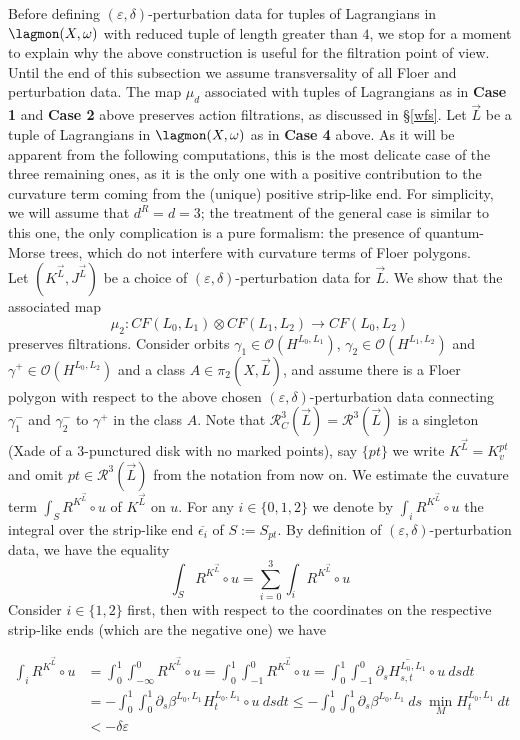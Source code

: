 	Before defining $(\varepsilon,\delta)$-perturbation data for tuples of Lagrangians in $\lagmon(X,\omega)$ with reduced tuple of length greater than $4$, we stop for a moment to explain why the above construction is useful for the filtration point of view. Until the end of this subsection we assume transversality of all Floer and perturbation data. The map $\mu_d$ associated with tuples of Lagrangians as in \textbf{Case 1} and \textbf{Case 2} above preserves action filtrations, as discussed in \S \ref{wfs}. Let $\vec{L}$ be a tuple of Lagrangians in $\lagmon(X,\omega)$ as in \textbf{Case 4} above. As it will be apparent from the following computations, this is the most delicate case of the three remaining ones, as it is the only one with a positive contribution to the curvature term coming from the (unique) positive strip-like end. For simplicity, we will assume that $d^R=d=3$; the treatment of the general case is similar to this one, the only complication is a pure formalism: the presence of quantum-Morse trees, which do not interfere with curvature terms of Floer polygons. \\ Let $(K^{\vec{L}}, J^{\vec{L}})$ be a choice of $(\varepsilon,\delta)$-perturbation data for $\vec{L}$. We show that the associated map $$\mu_2: CF(L_0,L_1)\otimes CF(L_1,L_2)\to CF(L_0,L_2)$$ preserves filtrations. Consider orbits $\gamma_1\in \mathcal{O}(H^{L_0,L_1})$, $\gamma_2\in \mathcal{O}(H^{L_1,L_2})$ and $\gamma^+\in \mathcal{O}(H^{L_0,L_2})$ and a class $A\in \pi_2(X,\vec{L})$, and assume there is a Floer polygon with respect to the above chosen $(\varepsilon,\delta)$-perturbation data connecting $\gamma_1^-$ and $\gamma_2^-$ to $\gamma^+$ in the class $A$. Note that $\mathcal{R}^{3}_C(\vec{L})=\mathcal{R}^{3}(\vec{L})$ is a singleton (Xade of a $3$-punctured disk with no marked points), say $\{pt\}$ we write $K^{\vec{L}}= K^{pt}_v$ and omit $pt\in \mathcal{R}^{3}(\vec{L})$ from the notation from now on. We estimate the cuvature term $\int_SR^{K^{\vec{L}}}\circ u$ of $K^{\vec{L}}$ on $u$. For any $i\in\{0,1,2\}$ we denote by $\int_iR^{K^{\vec{L}}}\circ u$ the integral over the strip-like end $\overline{\epsilon_i}$ of $S:=S_{pt}$. By definition of $(\varepsilon,\delta)$-perturbation data, we have the equality $$\int_S R^{K^{\vec{L}}}\circ u = \sum_{i=0}^3 \int_iR^{K^{\vec{L}}}\circ u$$ Consider $i\in \{1,2\}$ first, then with respect to the coordinates on the respective strip-like ends (which are the negative one) we have
	
	\begin{align*} \int_iR^{K^{\vec{L}}}\circ u &= \int_0^1\int_{-\infty}^0 R^{K^{\vec{L}}}\circ u = \int_0^1\int_{-1}^0 R^{K^{\vec{L}}}\circ u = \int_0^1\int_{-1}^0 \partial_s \overline{H^{L_0,L_1}_{s,t}}\circ u\ dsdt \\ & = -\int_0^1\int_0^1 \partial_s\beta^{L_0,L_1}H^{L_0,L_1}_t\circ u \ ds dt\leq -\int_0^1\int_0^1\partial_s\beta^{L_0,L_1}\ ds \ \min_MH^{L_0,L_1}_t\ dt\\ & < -\delta\varepsilon     \end{align*}
	
